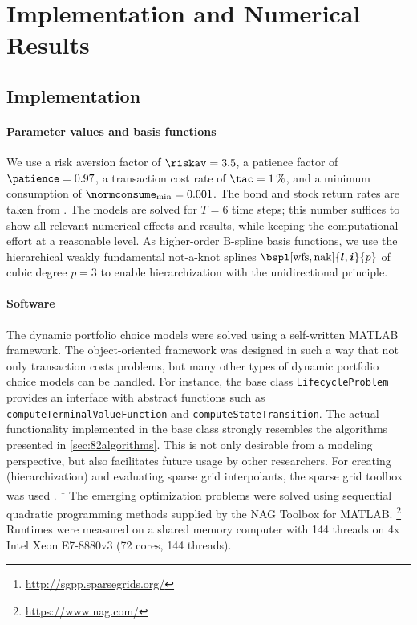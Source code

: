 \section{Implementation and Numerical Results}
\label{sec:84results}


\parbox{1em}{}
\vspace{-3em}



\printornamentsfalse
\subsection{Implementation}
\label{sec:841implementation}
\printornamentstrue

\paragraph{Parameter values and basis functions}

We use
a risk aversion factor of $\riskav = 3.5$,
a patience factor of $\patience = 0.97$,
a transaction cost rate of $\tac = \SI{1}{\percent}$, and
a minimum consumption of $\normconsume_{\min} = 0.001$.
The bond and stock return rates are taken from \cite{Cai10Stable}.
The models are solved for $T = 6$ time steps;
this number suffices to show all relevant numerical effects and results,
while keeping the computational effort at a reasonable level.
As higher-order B-spline basis functions,
we use the hierarchical weakly fundamental not-a-knot splines
$\bspl[\wfs,\nak]{\*l,\*i}{p}$ of cubic degree $p = 3$
to enable hierarchization with the unidirectional principle.

\vspace*{-0.5em}

\paragraph{Software}

The dynamic portfolio choice models were solved using a self-written
MATLAB framework.
The object-oriented framework was designed in such a way that
not only transaction costs problems,
but many other types of dynamic portfolio choice models can be handled.
For instance, the base class \texttt{LifecycleProblem} provides
an interface with abstract functions such as
\texttt{computeTerminalValueFunction} and
\texttt{computeStateTransition}.
The actual functionality implemented in the base class strongly resembles
the algorithms presented in \cref{sec:82algorithms}.
This is not only desirable from a modeling perspective,
but also facilitates future usage by other researchers.
For creating (hierarchization) and evaluating sparse grid interpolants,
the sparse grid toolbox \sgpp was used \cite{Pflueger10Spatially}.%
\footnote{%
  \url{http://sgpp.sparsegrids.org/}%
}
The emerging optimization problems were solved using
sequential quadratic programming methods supplied by the
NAG Toolbox for MATLAB.%
\footnote{%
  \url{https://www.nag.com/}%
}
Runtimes were measured on a shared memory computer
with 144 threads on 4x Intel Xeon E7-8880v3 (72 cores, 144 threads).

